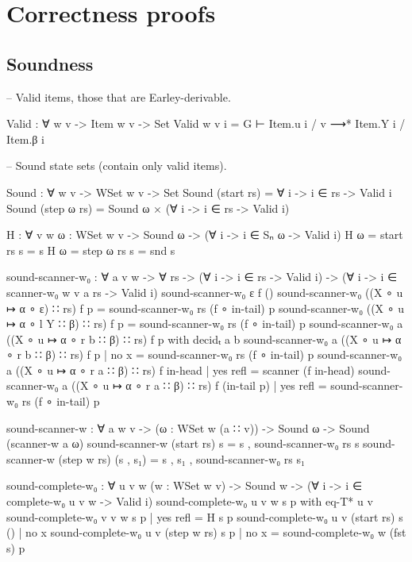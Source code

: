 
\chapter{Correctness proofs}
	
	\section{Soundness}
		\begin{code}

			-- Valid items, those that are Earley-derivable.
			
			Valid : ∀ {w v} -> Item w v -> Set
			Valid {w} {v} i = G ⊢ Item.u i / v ⟶* Item.Y i / Item.β i
			
			-- Sound state sets (contain only valid items).
			
			Sound : ∀ {w v} -> WSet w v -> Set
			Sound (start rs) = ∀ {i} -> i ∈ rs -> Valid i
			Sound (step ω rs) = Sound ω × (∀ {i} -> i ∈ rs -> Valid i)
			
			H : ∀ {v w} {ω : WSet w v} -> Sound ω -> (∀ {i} -> i ∈ Sₙ ω -> Valid i)
			H {ω = start rs} s = s
			H {ω = step ω rs} s = snd s
			
			sound-scanner-w₀ : ∀ {a v w} -> ∀ rs ->
			  (∀ {i} -> i ∈ rs -> Valid i) ->
			  (∀ {i} -> i ∈ scanner-w₀ {w} {v} a rs -> Valid i)
			sound-scanner-w₀ ε f ()
			sound-scanner-w₀ ((X ∘ u ↦ α ∘ ε) ∷ rs) f p = sound-scanner-w₀ rs (f ∘ in-tail) p
			sound-scanner-w₀ ((X ∘ u ↦ α ∘ l Y ∷ β) ∷ rs) f p = sound-scanner-w₀ rs (f ∘ in-tail) p
			sound-scanner-w₀ {a} ((X ∘ u ↦ α ∘ r b ∷ β) ∷ rs) f p with decidₜ a b
			sound-scanner-w₀ {a} ((X ∘ u ↦ α ∘ r b ∷ β) ∷ rs) f p | no x = sound-scanner-w₀ rs (f ∘ in-tail) p
			sound-scanner-w₀ {a} ((X ∘ u ↦ α ∘ r a ∷ β) ∷ rs) f in-head | yes refl = scanner (f in-head)
			sound-scanner-w₀ {a} ((X ∘ u ↦ α ∘ r a ∷ β) ∷ rs) f (in-tail p) | yes refl
			  = sound-scanner-w₀ rs (f ∘ in-tail) p
			
			sound-scanner-w : ∀ {a w v} -> (ω : WSet w (a ∷ v)) ->
			  Sound ω -> Sound (scanner-w a ω)
			sound-scanner-w (start rs) s = s , sound-scanner-w₀ rs s
			sound-scanner-w (step w rs) (s , s₁) = s , s₁ , sound-scanner-w₀ rs s₁
			
			sound-complete-w₀ : ∀ {u v w} (w : WSet w v) ->
			  Sound w -> (∀ {i} -> i ∈ complete-w₀ {u} {v} w -> Valid i)
			sound-complete-w₀ {u} {v} w s p           with eq-T* u v
			sound-complete-w₀ {v} {v} w s p           | yes refl = H s p
			sound-complete-w₀ {u} {v} (start rs) s () | no x
			sound-complete-w₀ {u} {v} (step w rs) s p | no x = sound-complete-w₀ w (fst s) p
			

\end{code}
